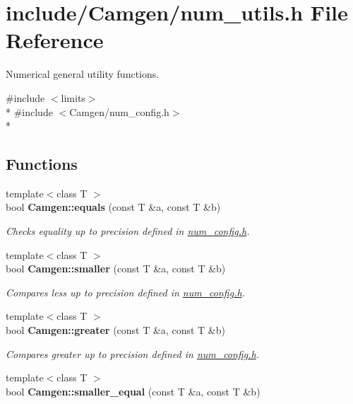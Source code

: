 \hypertarget{a00703}{}\section{include/\+Camgen/num\+\_\+utils.h File Reference}
\label{a00703}


Numerical general utility functions.  


{\ttfamily \#include $<$limits$>$}\\*
{\ttfamily \#include $<$Camgen/num\+\_\+config.\+h$>$}\\*
\subsection*{Functions}
\begin{DoxyCompactItemize}
\item 
\hypertarget{a00878_a50a3303ac8dce20ffe82b1caf039e939}{}{\footnotesize template$<$class T $>$ }\\bool {\bfseries Camgen\+::equals} (const T \&a, const T \&b)\label{a00878_a50a3303ac8dce20ffe82b1caf039e939}

\begin{DoxyCompactList}\small\item\em Checks equality up to precision defined in \hyperlink{a00702}{num\+\_\+config.\+h}. \end{DoxyCompactList}\item 
\hypertarget{a00878_a8f5142b3888287470790df9e8a637536}{}{\footnotesize template$<$class T $>$ }\\bool {\bfseries Camgen\+::smaller} (const T \&a, const T \&b)\label{a00878_a8f5142b3888287470790df9e8a637536}

\begin{DoxyCompactList}\small\item\em Compares less up to precision defined in \hyperlink{a00702}{num\+\_\+config.\+h}. \end{DoxyCompactList}\item 
\hypertarget{a00878_a42c316d086e5ade0b638aa6817c87dc7}{}{\footnotesize template$<$class T $>$ }\\bool {\bfseries Camgen\+::greater} (const T \&a, const T \&b)\label{a00878_a42c316d086e5ade0b638aa6817c87dc7}

\begin{DoxyCompactList}\small\item\em Compares greater up to precision defined in \hyperlink{a00702}{num\+\_\+config.\+h}. \end{DoxyCompactList}\item 
\hypertarget{a00878_a0491952a9fbe9eec9bf5991e9ad03cc3}{}{\footnotesize template$<$class T $>$ }\\bool {\bfseries Camgen\+::smaller\+\_\+equal} (const T \&a, const T \&b)\label{a00878_a0491952a9fbe9eec9bf5991e9ad03cc3}


\end{DoxyCompactItemize}
